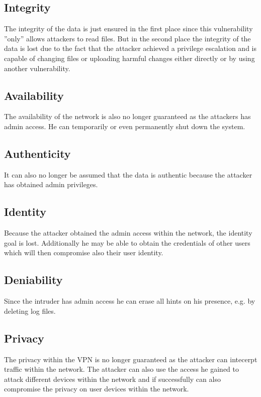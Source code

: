 \subsection{Integrity}
The integrity of the data is just ensured in the first place since this vulnerability ''only'' allows attackers to read files. But in the second place the integrity of the data is lost due to the fact that the attacker achieved a privilege escalation and is capable of changing files or uploading harmful changes either directly or by using another vulnerability.

\subsection{Availability}
The availability of the network is also no longer guaranteed as the attackers has admin access. He can temporarily or even permanently shut down the system.

\subsection{Authenticity}
It can also no longer be assumed that the data is authentic because the attacker has obtained admin privileges.

\subsection{Identity}
Because the attacker obtained the admin access within the network, the identity goal is lost. Additionally he may be able to obtain the credentials of other users which will then compromise also their user identity.

\subsection{Deniability}
Since the intruder has admin access he can erase all hints on his presence, e.g. by deleting log files.

\subsection{Privacy}
The privacy within the VPN is no longer guaranteed as the attacker can intecerpt traffic within the network. The attacker can also use the access he gained to attack different devices within the network and if successfully can also compromise the privacy on user devices within the network.


